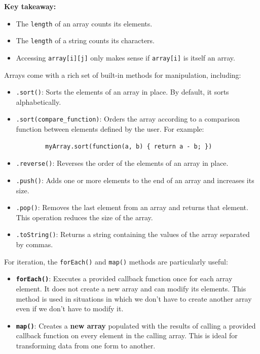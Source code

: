 \documentclass{scrbook}
\begin{document}
\begin{itemize}
        \textbf{Key takeaway:}
        \begin{itemize}
            \item The \texttt{length} of an array counts its elements.
            \item The \texttt{length} of a string counts its characters.
            \item Accessing \texttt{array[i][j]} only makes sense if \texttt{array[i]} is itself an array.
        \end{itemize}
\end{itemize}

Arrays come with a rich set of built-in methods for manipulation, including:

\begin{itemize} 
    \item
    \texttt{.sort()}: Sorts the elements of an array in place. By default, it sorts alphabetically.

    \item 
    \texttt{.sort(compare\_function)}: Orders the array according to a comparison function between elements defined by the user. For example:
    \begin{lstlisting}
        myArray.sort(function(a, b) { return a - b; })
    \end{lstlisting}
    
    \item
    \texttt{.reverse()}: Reverses the order of the elements of an array in place.
    
    \item
    \texttt{.push()}: Adds one or more elements to the end of an array and increases its size.
    
    \item
    \texttt{.pop()}: Removes the last element from an array and returns that element. This operation reduces the size of the array.

    \item
    \texttt{.toString()}: Returns a string containing the values of the array separated by commas.
\end{itemize}

For iteration, the \texttt{forEach()} and \texttt{map()} methods are particularly useful:

\begin{itemize}
    \item
    \texttt{\textbf{forEach()}}: Executes a provided callback function once for each array element. It does not create a new array and can modify its elements. This method is used in situations in which we don't have to create another array even if we don't have to modify it. 
    
    \item
    \texttt{\textbf{map()}}: Creates a \textbf{new array} populated with the results of calling a provided callback function on every element in the calling array. This is ideal for transforming data from one form to another.
\end{itemize}
\end{document}
